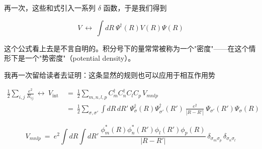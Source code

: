 再一次，这些和式引入一系列 $\delta$ 函数，于是我们得到

\begin{equation*}
V\ \longleftrightarrow\ \int dR\ \Psi^{\dagger}(R)V(R)\Psi(R)
\end{equation*}

这个公式看上去是不言自明的。积分号下的量常常被称为一个"密度"——在这个情形下是一个"势密度"（potential density）。

我再一次留给读者去证明：这条显然的规则也可以应用于相互作用势

\begin{align*}
\frac{1}{2}\sum_{i,j}\frac{e^2}{R_{ij}}\ \longleftrightarrow\ V_{\mathrm{int}}\
&=\ \frac{1}{2}\sum_{m,n,l,p} C_m^{\dagger} C_n^{\dagger} C_l C_p\, V_{mnlp}\\
&=\ \frac{1}{2}\sum_{\sigma,\sigma'}\int dR\,dR'\ \Psi_{\sigma}^{\dagger}(R)\Psi_{\sigma'}^{\dagger}(R')\ \frac{e^2}{|R-R'|}\ \Psi_{\sigma'}(R')\Psi_{\sigma}(R)
\end{align*}

\begin{equation*}
V_{mnlp}\ =\ e^2\int dR\int dR'\ \frac{\phi_m^{*}(R)\phi_n^{*}(R')\phi_l(R')\phi_p(R)}{|R-R'|}\ \delta_{\sigma_m\sigma_p}\,\delta_{\sigma_n\sigma_l}
\tag{4}
\end{equation*}
